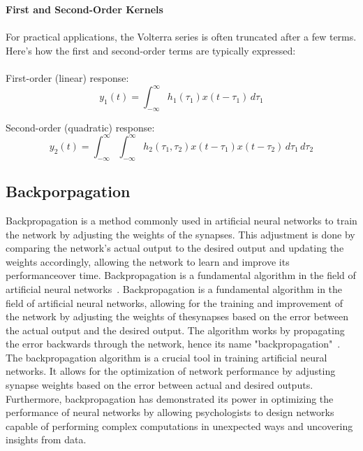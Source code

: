 \documentclass[12pt]{article}
\begin{document}
    \newpage
    \noindent \textbf{First and Second-Order Kernels}\\
    \\
    For practical applications, the Volterra series is often truncated after a few terms.
    Here's how the first and second-order terms are typically expressed:\\
    \\
    First-order (linear) response:\\
    \begin{equation}
    y_1(t) = \int_{-\infty}^\infty h_1(\tau_1) x(t-\tau_1) \, d\tau_1
    \end{equation}

    \noindent Second-order (quadratic) response:\\
    \begin{equation}
        y_2(t) = \int_{-\infty}^\infty \int_{-\infty}^\infty h_2(\tau_1, \tau_2) x(t-\tau_1) x(t-\tau_2) \, d\tau_1 \, d\tau_2
    \end{equation}
    \subsection{Backporpagation}
    Backpropagation is a method commonly used in artificial neural networks to train the network
    by adjusting the weights of the synapses. This adjustment is done by comparing the network's
    actual output to the desired output and updating the weights accordingly, allowing the network
    to learn and improve its performanceover time. Backpropagation is a fundamental algorithm in
    the field of artificial neural networks~\cite{WOS:000797637800002}. Backpropagation is a
    fundamental algorithm in the field of artificial neural networks, allowing for the training
    and improvement of the network by adjusting the weights of thesynapses based on the error
    between the actual output and the desired output. The algorithm works by propagating the
    error backwards through the network, hence its name "backpropagation"~\cite{WOS:000916261400001}.
    The backpropagation algorithm is a crucial tool in training artificial neural networks.
    It allows for the optimization of network performance by adjusting synapse weights based
    on the error between actual and desired outputs. Furthermore, backpropagation has
    demonstrated its power in optimizing the performance of neural networks by allowing
    psychologists to design networks capable of performing complex computations in
    unexpected ways and uncovering insights from data.\\
    
\end{document}
